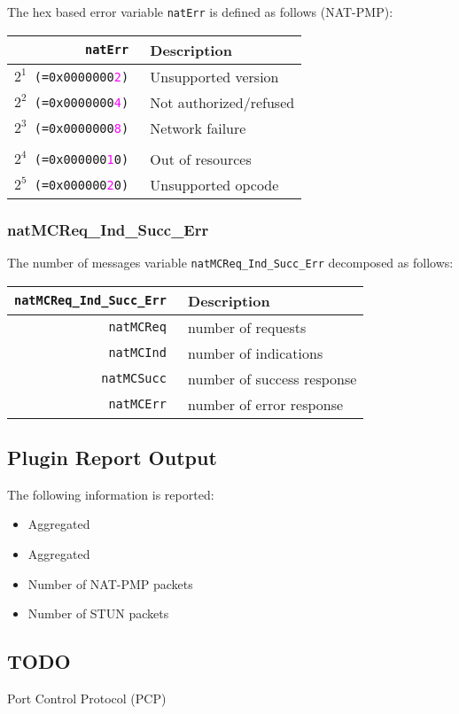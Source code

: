 \documentclass[documentation]{subfiles}
\begin{document}
The hex based error variable {\tt natErr} is defined as follows (NAT-PMP):
\begin{longtable}{>{\tt}rl}
    \toprule
    {\bf natErr} & {\bf Description} \\
    \midrule\endhead%
    $2^{1}$ (=0x0000000\textcolor{magenta}{2}) & Unsupported version\\
    $2^{2}$ (=0x0000000\textcolor{magenta}{4}) & Not authorized/refused\\
    $2^{3}$ (=0x0000000\textcolor{magenta}{8}) & Network failure\\
    \\
    $2^{4}$ (=0x000000\textcolor{magenta}{1}0) & Out of resources\\
    $2^{5}$ (=0x000000\textcolor{magenta}{2}0) & Unsupported opcode\\
    \bottomrule
\end{longtable}

\subsubsection{natMCReq\_Ind\_Succ\_Err}\label{natMCReqIndSuccErr}
The number of messages variable {\tt natMCReq\_Ind\_Succ\_Err} decomposed as follows:
\begin{longtable}{>{\tt}rl}
    \toprule
    {\bf natMCReq\_Ind\_Succ\_Err} & {\bf Description} \\
    \midrule\endhead%
    natMCReq  & number of requests\\
    natMCInd  & number of indications\\
    natMCSucc & number of success response\\
    natMCErr  & number of error response\\
    \bottomrule
\end{longtable}

\subsection{Plugin Report Output}
The following information is reported:
\begin{itemize}
    \item Aggregated {\tt{}}
    \item Aggregated {\tt{}}
    \item Number of NAT-PMP packets
    \item Number of STUN packets
\end{itemize}

\subsection{TODO}
Port Control Protocol (PCP)
\end{document}
